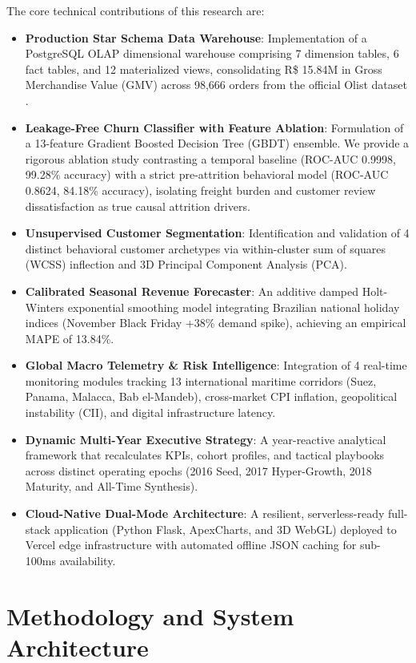 \documentclass[conference]{IEEEtran}
\begin{document}
The core technical contributions of this research are:
\begin{itemize}
    \item \textbf{Production Star Schema Data Warehouse}: Implementation of a PostgreSQL OLAP dimensional warehouse comprising 7 dimension tables, 6 fact tables, and 12 materialized views, consolidating R\$ 15.84M in Gross Merchandise Value (GMV) across 98,666 orders from the official Olist dataset .
    \item \textbf{Leakage-Free Churn Classifier with Feature Ablation}: Formulation of a 13-feature Gradient Boosted Decision Tree (GBDT) ensemble. We provide a rigorous ablation study contrasting a temporal baseline (ROC-AUC 0.9998, 99.28\% accuracy) with a strict pre-attrition behavioral model (ROC-AUC 0.8624, 84.18\% accuracy), isolating freight burden and customer review dissatisfaction as true causal attrition drivers.
    \item \textbf{Unsupervised Customer Segmentation}: Identification and validation of 4 distinct behavioral customer archetypes via within-cluster sum of squares (WCSS) inflection and 3D Principal Component Analysis (PCA).
    \item \textbf{Calibrated Seasonal Revenue Forecaster}: An additive damped Holt-Winters exponential smoothing model integrating Brazilian national holiday indices (November Black Friday +38\% demand spike), achieving an empirical MAPE of 13.84\%.
    \item \textbf{Global Macro Telemetry \& Risk Intelligence}: Integration of 4 real-time monitoring modules tracking 13 international maritime corridors (Suez, Panama, Malacca, Bab el-Mandeb), cross-market CPI inflation, geopolitical instability (CII), and digital infrastructure latency.
    \item \textbf{Dynamic Multi-Year Executive Strategy}: A year-reactive analytical framework that recalculates KPIs, cohort profiles, and tactical playbooks across distinct operating epochs (2016 Seed, 2017 Hyper-Growth, 2018 Maturity, and All-Time Synthesis).
    \item \textbf{Cloud-Native Dual-Mode Architecture}: A resilient, serverless-ready full-stack application (Python Flask, ApexCharts, and 3D WebGL) deployed to Vercel edge infrastructure with automated offline JSON caching for sub-100ms availability.
\end{itemize}

\section{Methodology and System Architecture}
\end{document}
